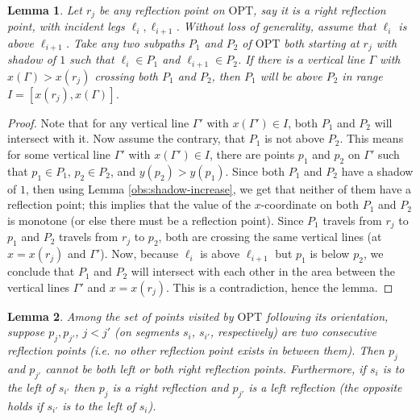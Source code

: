 \documentclass[pdflatex,sn-mathphys-num]{sn-jnl}
\theoremstyle{thmstyleone}
\newtheorem{lemma}{Lemma}
\newcommand{\OPT}{{\text{OPT}}}
\begin{document}
\begin{lemma}\label{obs:reflection-paths-above-below}
    Let $r_j$ be any reflection point on $\OPT$, say it is a right reflection point, with incident legs $\ell_i, \ell_{i + 1}$. Without loss of generality, assume that $\ell_i$ is above $\ell_{i + 1}$. Take any two subpaths $P_1$ and $P_2$ of $\OPT$ both starting at $r_j$ with shadow of $1$ such that $\ell_{i}\in P_1$ and $\ell_{i + 1}\in P_2$. 
    If there is a vertical line $\Gamma$ with $x(\Gamma) > x(r_j)$ crossing both $P_1$ and $P_2$, then $P_1$ will be above $P_2$ in range $I = [x(r_j), x(\Gamma)]$.
\end{lemma}

\begin{proof}
    Note that for any vertical line $\Gamma'$ with $x(\Gamma') \in I$, both $P_1$ and $P_2$ will intersect with it.
    Now assume the contrary, that $P_1$ is not above $P_2$. This means for some vertical line $\Gamma'$ with $x(\Gamma') \in I$, there are points $p_1$ and $p_2$ on $\Gamma'$ such that $p_1\in P_1$, $p_2\in P_2$, and $y(p_2) > y(p_1)$. Since both $P_1$ and $P_2$ have a shadow of $1$, then using Lemma \ref{obs:shadow-increase}, we get that neither of them have a reflection point; this implies that the value of the $x$-coordinate on both $P_1$ and $P_2$ is monotone (or else there must be a reflection point). 
    Since $P_1$ travels from $r_j$ to $p_1$ and $P_2$ travels from $r_j$ to $p_2$, both are crossing the same vertical lines (at $x=x(r_j)$ and $\Gamma'$). 
    Now, because $\ell_i$ is above $\ell_{i + 1}$ but $p_1$ is below $p_2$, we conclude that $P_1$ and $P_2$ will intersect with each other in the area between the vertical lines $\Gamma'$ and $x = x(r_j)$. This is a contradiction, hence the lemma.
\end{proof}

	
\begin{lemma}\label{obs:consecutive-reflections}
    Among the set of points visited by $\OPT$ following its orientation, suppose $p_{j},p_{j'}$, $j < j'$ (on segments $s_i$, $s_{i'}$, respectively) are two consecutive reflection points (i.e. no other reflection point exists in between them). Then $p_j$ and 
    $p_{j'}$ cannot be both left or both right reflection points. Furthermore, if $s_i$ is to the left of $s_{i'}$ then $p_j$ is a
    right reflection and $p_{j'}$ is a left reflection (the opposite holds if $s_{i'}$ is to the left of $s_i$).
\end{lemma}
\end{document}
